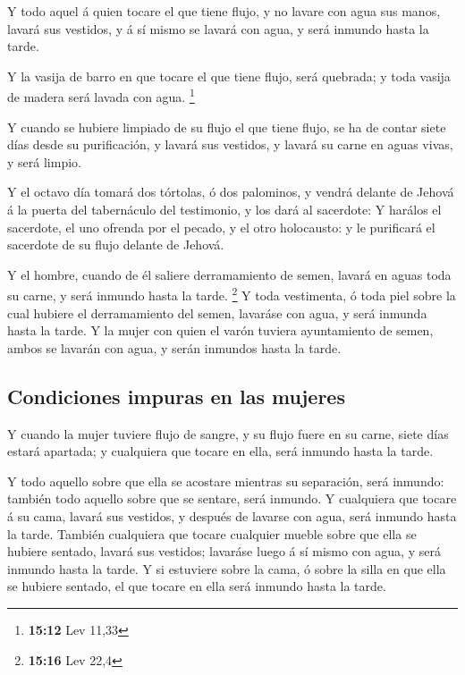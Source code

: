  Y todo aquel á quien tocare el que tiene flujo, y no
lavare con agua sus manos, lavará sus vestidos, y á sí mismo se lavará
con agua, y será inmundo hasta la tarde.

 Y la vasija de barro en que tocare el que tiene flujo,
será quebrada; y toda vasija de madera será lavada con agua. \footnote{\textbf{15:12}
  Lev 11,33}

 Y cuando se hubiere limpiado de su flujo el que tiene
flujo, se ha de contar siete días desde su purificación, y lavará sus
vestidos, y lavará su carne en aguas vivas, y será limpio.

 Y el octavo día tomará dos tórtolas, ó dos palominos, y
vendrá delante de Jehová á la puerta del tabernáculo del testimonio, y
los dará al sacerdote:  Y harálos el sacerdote, el uno
ofrenda por el pecado, y el otro holocausto: y le purificará el
sacerdote de su flujo delante de Jehová.

 Y el hombre, cuando de él saliere derramamiento de
semen, lavará en aguas toda su carne, y será inmundo hasta la tarde.
\footnote{\textbf{15:16} Lev 22,4}  Y toda vestimenta, ó
toda piel sobre la cual hubiere el derramamiento del semen, lavaráse con
agua, y será inmunda hasta la tarde.  Y la mujer con
quien el varón tuviera ayuntamiento de semen, ambos se lavarán con agua,
y serán inmundos hasta la tarde.

\hypertarget{condiciones-impuras-en-las-mujeres}{%
\subsection{Condiciones impuras en las
mujeres}\label{condiciones-impuras-en-las-mujeres}}

 Y cuando la mujer tuviere flujo de sangre, y su flujo
fuere en su carne, siete días estará apartada; y cualquiera que tocare
en ella, será inmundo hasta la tarde.

 Y todo aquello sobre que ella se acostare mientras su
separación, será inmundo: también todo aquello sobre que se sentare,
será inmundo.  Y cualquiera que tocare á su cama, lavará
sus vestidos, y después de lavarse con agua, será inmundo hasta la
tarde.  También cualquiera que tocare cualquier mueble
sobre que ella se hubiere sentado, lavará sus vestidos; lavaráse luego á
sí mismo con agua, y será inmundo hasta la tarde.  Y si
estuviere sobre la cama, ó sobre la silla en que ella se hubiere
sentado, el que tocare en ella será inmundo hasta la tarde.

